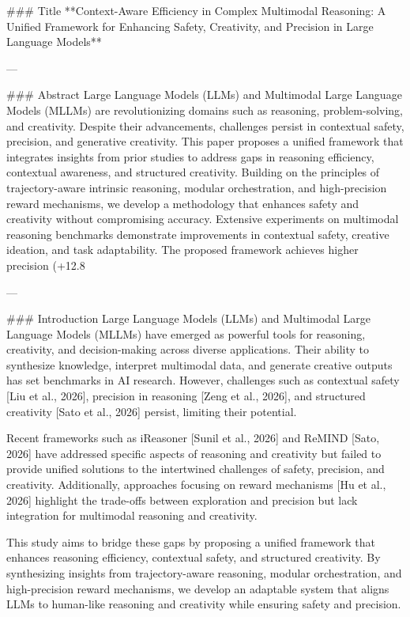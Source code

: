 ### Title
**Context-Aware Efficiency in Complex Multimodal Reasoning: A Unified Framework for Enhancing Safety, Creativity, and Precision in Large Language Models**

---

### Abstract
Large Language Models (LLMs) and Multimodal Large Language Models (MLLMs) are revolutionizing domains such as reasoning, problem-solving, and creativity. Despite their advancements, challenges persist in contextual safety, precision, and generative creativity. This paper proposes a unified framework that integrates insights from prior studies to address gaps in reasoning efficiency, contextual awareness, and structured creativity. Building on the principles of trajectory-aware intrinsic reasoning, modular orchestration, and high-precision reward mechanisms, we develop a methodology that enhances safety and creativity without compromising accuracy. Extensive experiments on multimodal reasoning benchmarks demonstrate improvements in contextual safety, creative ideation, and task adaptability. The proposed framework achieves higher precision (+12.8%

---

### Introduction
Large Language Models (LLMs) and Multimodal Large Language Models (MLLMs) have emerged as powerful tools for reasoning, creativity, and decision-making across diverse applications. Their ability to synthesize knowledge, interpret multimodal data, and generate creative outputs has set benchmarks in AI research. However, challenges such as contextual safety [Liu et al., 2026], precision in reasoning [Zeng et al., 2026], and structured creativity [Sato et al., 2026] persist, limiting their potential.

Recent frameworks such as iReasoner [Sunil et al., 2026] and ReMIND [Sato, 2026] have addressed specific aspects of reasoning and creativity but failed to provide unified solutions to the intertwined challenges of safety, precision, and creativity. Additionally, approaches focusing on reward mechanisms [Hu et al., 2026] highlight the trade-offs between exploration and precision but lack integration for multimodal reasoning and creativity.

This study aims to bridge these gaps by proposing a unified framework that enhances reasoning efficiency, contextual safety, and structured creativity. By synthesizing insights from trajectory-aware reasoning, modular orchestration, and high-precision reward mechanisms, we develop an adaptable system that aligns LLMs to human-like reasoning and creativity while ensuring safety and precision.

